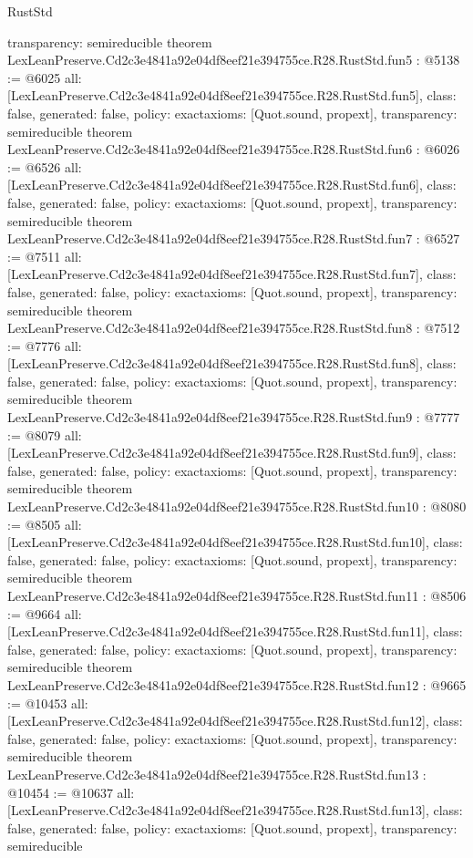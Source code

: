 \begin{lexlean}{RustStd}
\begin{coremodule}
{  transparency: semireducible
}
theorem LexLeanPreserve.Cd2c3e4841a92e04df8eef21e394755ce.R28.RustStd.fun5 : @5138 := @6025 {
  all: [LexLeanPreserve.Cd2c3e4841a92e04df8eef21e394755ce.R28.RustStd.fun5],
  class: false,
  generated: false,
  policy: exact{axioms: [Quot.sound, propext]},
  transparency: semireducible
}
theorem LexLeanPreserve.Cd2c3e4841a92e04df8eef21e394755ce.R28.RustStd.fun6 : @6026 := @6526 {
  all: [LexLeanPreserve.Cd2c3e4841a92e04df8eef21e394755ce.R28.RustStd.fun6],
  class: false,
  generated: false,
  policy: exact{axioms: [Quot.sound, propext]},
  transparency: semireducible
}
theorem LexLeanPreserve.Cd2c3e4841a92e04df8eef21e394755ce.R28.RustStd.fun7 : @6527 := @7511 {
  all: [LexLeanPreserve.Cd2c3e4841a92e04df8eef21e394755ce.R28.RustStd.fun7],
  class: false,
  generated: false,
  policy: exact{axioms: [Quot.sound, propext]},
  transparency: semireducible
}
theorem LexLeanPreserve.Cd2c3e4841a92e04df8eef21e394755ce.R28.RustStd.fun8 : @7512 := @7776 {
  all: [LexLeanPreserve.Cd2c3e4841a92e04df8eef21e394755ce.R28.RustStd.fun8],
  class: false,
  generated: false,
  policy: exact{axioms: [Quot.sound, propext]},
  transparency: semireducible
}
theorem LexLeanPreserve.Cd2c3e4841a92e04df8eef21e394755ce.R28.RustStd.fun9 : @7777 := @8079 {
  all: [LexLeanPreserve.Cd2c3e4841a92e04df8eef21e394755ce.R28.RustStd.fun9],
  class: false,
  generated: false,
  policy: exact{axioms: [Quot.sound, propext]},
  transparency: semireducible
}
theorem LexLeanPreserve.Cd2c3e4841a92e04df8eef21e394755ce.R28.RustStd.fun10 : @8080 := @8505 {
  all: [LexLeanPreserve.Cd2c3e4841a92e04df8eef21e394755ce.R28.RustStd.fun10],
  class: false,
  generated: false,
  policy: exact{axioms: [Quot.sound, propext]},
  transparency: semireducible
}
theorem LexLeanPreserve.Cd2c3e4841a92e04df8eef21e394755ce.R28.RustStd.fun11 : @8506 := @9664 {
  all: [LexLeanPreserve.Cd2c3e4841a92e04df8eef21e394755ce.R28.RustStd.fun11],
  class: false,
  generated: false,
  policy: exact{axioms: [Quot.sound, propext]},
  transparency: semireducible
}
theorem LexLeanPreserve.Cd2c3e4841a92e04df8eef21e394755ce.R28.RustStd.fun12 : @9665 := @10453 {
  all: [LexLeanPreserve.Cd2c3e4841a92e04df8eef21e394755ce.R28.RustStd.fun12],
  class: false,
  generated: false,
  policy: exact{axioms: [Quot.sound, propext]},
  transparency: semireducible
}
theorem LexLeanPreserve.Cd2c3e4841a92e04df8eef21e394755ce.R28.RustStd.fun13 : @10454 := @10637 {
  all: [LexLeanPreserve.Cd2c3e4841a92e04df8eef21e394755ce.R28.RustStd.fun13],
  class: false,
  generated: false,
  policy: exact{axioms: [Quot.sound, propext]},
  transparency: semireducible
}
\end{coremodule}
\end{lexlean}
